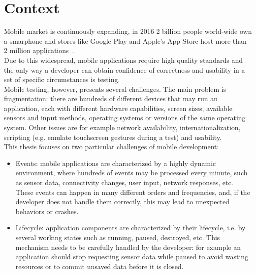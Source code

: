 \documentclass[11pt,a4paper,notitlepage]{article}
\begin{document}
\section{Context}
Mobile market is continuously expanding, in 2016 2 billion people world-wide own a smarphone and stores like Google Play and Apple's App Store host more than 2 million applications~\cite{stats}.\medskip \\
Due to this widespread, mobile applications require high quality standards and the only way a developer can obtain confidence of correctness and usability in a set of specific circumstances is testing.\bigskip \\
Mobile testing, however, presents several challenges. The main problem is fragmentation: there are hundreds of different devices that may run an application, each with different hardware capabilities, screen sizes, available sensors and input methods, operating systems or versions of the same operating system. Other issues are for example network availability, internationalization, scripting (e.g. emulate touchscreen gestures during a test) and usability.
\bigskip \\
This thesis focuses on two particular challenges of mobile development:
\begin{itemize}
	\item Events: mobile applications are characterized by a highly dynamic environment, where hundreds of events may be processed every minute, such as sensor data, connectivity changes, user input, network responses, etc. These events can happen in many different orders and frequencies, and, if the developer does not handle them correctly, this may lead to unexpected behaviors or crashes.
	\item Lifecycle: application components are characterized by their lifecycle, i.e. by several working states such as running, paused, destroyed, etc. This mechanism needs to be carefully handled by the developer: for example an application should stop requesting sensor data while paused to avoid wasting resources or to commit unsaved data before it is closed.
\end{itemize}
\end{document}
